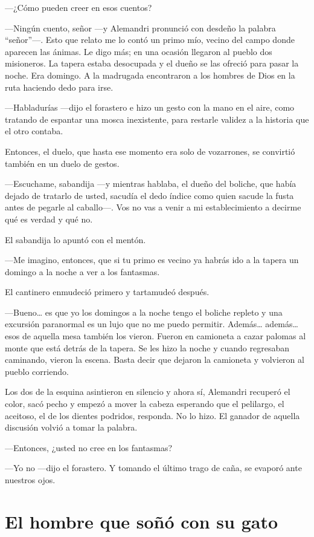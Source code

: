 \documentclass[11pt,twoside,openright]{book}
\begin{document}
—¿Cómo pueden creer en esos cuentos?

—Ningún cuento, señor —y Alemandri pronunció con desdeño la palabra “señor”—. Esto que relato me lo contó un primo mío, vecino del campo donde aparecen las ánimas. Le digo más; en una ocasión llegaron al pueblo dos misioneros. La tapera estaba desocupada y el dueño se las ofreció para pasar la noche. Era domingo. A la madrugada encontraron a los hombres de Dios en la ruta haciendo dedo para irse.

—Habladurías —dijo el forastero e hizo un gesto con la mano en el aire, como tratando de espantar una mosca inexistente, para restarle validez a la historia que el otro contaba.

Entonces, el duelo, que hasta ese momento era solo de vozarrones, se convirtió también en un duelo de gestos.

—Escuchame, sabandija —y mientras hablaba, el dueño del boliche, que había dejado de tratarlo de usted, sacudía el dedo índice como quien sacude la fusta antes de pegarle al caballo—. Vos no vas a venir a mi establecimiento a decirme qué es verdad y qué no.

El sabandija lo apuntó con el mentón.

—Me imagino, entonces, que si tu primo es vecino ya habrás ido a la tapera un domingo a la noche a ver a los fantasmas.

El cantinero enmudeció primero y tartamudeó después.

—Bueno… es que yo los domingos a la noche tengo el boliche repleto y una excursión paranormal es un lujo que no me puedo permitir. Además… además… esos de aquella mesa también los vieron. Fueron en camioneta a cazar palomas al monte que está detrás de la tapera. Se les hizo la noche y cuando regresaban caminando, vieron la escena. Basta decir que dejaron la camioneta y volvieron al pueblo corriendo.

Los dos de la esquina asintieron en silencio y ahora sí, Alemandri recuperó el color, sacó pecho y empezó a mover la cabeza esperando que el pelilargo, el aceitoso, el de los dientes podridos, responda. No lo hizo. El ganador de aquella discusión volvió a tomar la palabra.

—Entonces, ¿usted no cree en los fantasmas?

—Yo no —dijo el forastero. Y tomando el último trago de caña, se evaporó ante nuestros ojos.





\chapter*{El hombre que soñó con su gato} 
\end{document}
